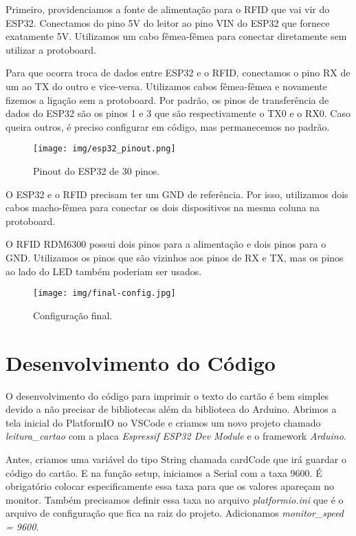 \documentclass[12pt]{article}
\begin{document}
Primeiro, providenciamos a fonte de alimentação para o RFID que vai vir do ESP32. Conectamos do pino 5V do leitor ao pino VIN do ESP32 que fornece exatamente 5V. Utilizamos um cabo fêmea-fêmea para conectar diretamente sem utilizar a protoboard.

Para que ocorra troca de dados entre ESP32 e o RFID, conectamos o pino RX de um ao TX do outro e vice-versa. Utilizamos cabos fêmea-fêmea e novamente fizemos a ligação sem a protoboard. Por padrão, os pinos de transferência de dados do ESP32 são os pinos 1 e 3 que são respectivamente o TX0 e o RX0. Caso queira outros, é preciso configurar em código, mas permanecemos no padrão.

\begin{figure}[H]
    \centering
    \texttt{[image: img/esp32\_pinout.png]}
    \caption{Pinout do ESP32 de 30 pinos.}
    \label{fig:esp32-pinout}
\end{figure}

O ESP32 e o RFID precisam ter um GND de referência. Por isso, utilizamos dois cabos macho-fêmea para conectar os dois dispositivos na mesma coluna na protoboard.

O RFID RDM6300 possui dois pinos para a alimentação e dois pinos para o GND. Utilizamos os pinos que são vizinhos aos pinos de RX e TX, mas os pinos ao lado do LED também poderiam ser usados.

\begin{figure}[H]
    \centering
    \texttt{[image: img/final-config.jpg]}
    \caption{Configuração final.}
    \label{fig:final-config}
\end{figure}

\section{Desenvolvimento do Código}

O desenvolvimento do código para imprimir o texto do cartão é bem simples devido a não precisar de bibliotecas além da biblioteca do Arduino. Abrimos a tela inicial do PlatformIO no VSCode e criamos um novo projeto chamado \textit{leitura\_cartao} com a placa \textit{Espressif ESP32 Dev Module} e o framework \textit{Arduino}.



Antes, criamos uma variável do tipo String chamada cardCode que irá guardar o código do cartão. E na função setup, iniciamos a Serial com a taxa 9600. É obrigatório colocar especificamente essa taxa para que os valores apareçam no monitor. Também precisamos definir essa taxa no arquivo \textit{platformio.ini} que é o arquivo de configuração que fica na raiz do projeto. Adicionamos \textit{monitor\_speed = 9600}.
\end{document}

